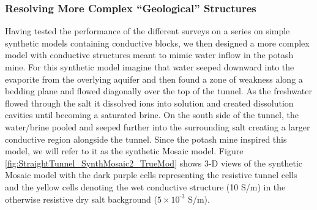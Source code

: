 \documentclass[preprint,authoryear,12pt]{elsarticle}
\begin{document}
\subsubsection{Resolving More Complex ``Geological'' Structures}
\label{sec:RingArray_Development_Straight_Synth_GeologicalTarget}

Having tested the performance of the different surveys on a series on simple synthetic models containing conductive blocks, we then designed a more complex model with conductive structures meant to mimic water inflow in the potash mine. For this synthetic model imagine that water seeped downward into the evaporite from the overlying aquifer and then found a zone of weakness along a bedding plane and flowed diagonally over the top of the tunnel. As the freshwater flowed through the salt it dissolved ions into solution and created dissolution cavities until becoming a saturated brine. On the south side of the tunnel, the water/brine pooled and seeped further into the surrounding salt creating a larger conductive region alongside the tunnel. Since the potash mine inspired this model, we will refer to it as the synthetic Mosaic model.  Figure \ref{fig:StraightTunnel_SynthMosaic2_TrueMod} shows 3-D views of the synthetic Mosaic model with the dark purple cells representing the resistive tunnel cells and the yellow cells denoting the wet conductive structure (10 S/m) in the otherwise resistive dry salt background ($5 \times 10^{\text{-3}}$ S/m).
\end{document}
